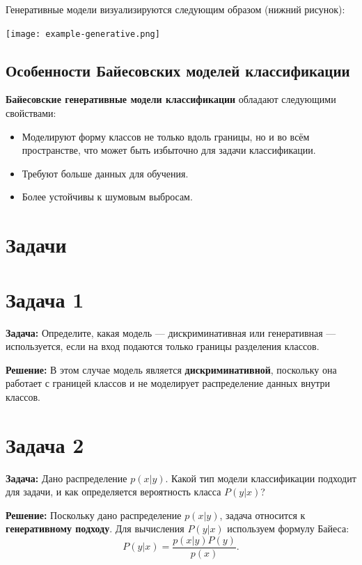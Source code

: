 \noindent Генеративные модели визуализируются следующим образом (нижний рисунок):
\begin{center}
    \texttt{[image: example-generative.png]} %
\end{center}

\subsection{Особенности Байесовских моделей классификации}
\textbf{Байесовские генеративные модели классификации} обладают следующими свойствами:
\begin{itemize}
    \item Моделируют форму классов не только вдоль границы, но и во всём пространстве, что может быть избыточно для задачи классификации.
    \item Требуют больше данных для обучения.
    \item Более устойчивы к шумовым выбросам.
\end{itemize}

\section{Задачи}


\section*{Задача 1}
\textbf{Задача:} Определите, какая модель — дискриминативная или генеративная — используется, если на вход подаются только границы разделения классов.

\textbf{Решение:} В этом случае модель является \textbf{дискриминативной}, поскольку она работает с границей классов и не моделирует распределение данных внутри классов.

\section*{Задача 2}
\textbf{Задача:} Дано распределение $p(x|y)$. Какой тип модели классификации подходит для задачи, и как определяется вероятность класса $P(y|x)$?

\textbf{Решение:} Поскольку дано распределение $p(x|y)$, задача относится к \textbf{генеративному подходу}. Для вычисления $P(y|x)$ используем формулу Байеса:
\begin{equation}
P(y|x) = \frac{p(x|y) P(y)}{p(x)}.
\end{equation}

